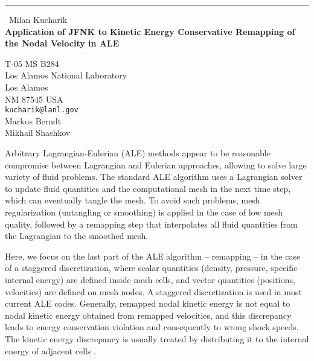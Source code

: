 \documentclass{report}
\begin{document}
\begin{center}
\rule{6in}{1pt} \
{\large Milan Kucharik \\
{\bf Application of JFNK to Kinetic Energy Conservative Remapping of the Nodal Velocity in ALE}}

T-05 MS B284 \\ Los Alamos National Laboratory \\ Los Alamos \\ NM 87545 USA
\\
{\tt kucharik@lanl.gov}\\
Markus Berndt\\
Mikhail Shashkov\end{center}

Arbitrary Lagrangian-Eulerian (ALE) methods appear to be reasonable
compromise between Lagrangian and Eulerian approaches, allowing to solve
large variety of fluid problems. The standard ALE algorithm uses a
Lagrangian solver to update fluid quantities and the computational mesh
in the next time step, which can eventually tangle the mesh. To avoid
such problems, mesh regularization (untangling or smoothing) is applied
in the case of low mesh quality, followed by a remapping step that
interpolates all fluid quantities from the Lagrangian to the smoothed
mesh.

Here, we focus on the last part of the ALE algorithm -- remapping -- in
the case of a staggered discretization, where scalar quantities (density,
pressure, specific internal energy) are defined inside mesh cells, and
vector quantities (positions, velocities) are defined on mesh nodes. A
staggered discretization is used in most current ALE codes. Generally,
remapped nodal kinetic energy is not equal to nodal kinetic energy
obtained from remapped velocities, and this discrepancy leads to energy
conservation violation and consequently to wrong shock speeds. The
kinetic energy discrepancy is usually treated by distributing it to the
internal energy of adjacent cells \cite{Benson:hydrocodes}.
\end{document}
